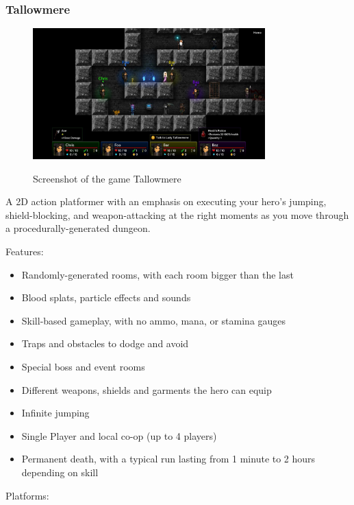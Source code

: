 \documentclass[12p]{article}
\begin{document}
\subsubsection[Tallowmere]{Tallowmere \cite{Tallowmere}} \label{sec:StateOfTheArt_Tallowmere}

\begin{figure}[ht]
  \center
  \includegraphics[width=0.8\textwidth]{StateOfTheArtScreenshots/tallowmere.jpeg}
  \label{sec:StateOfTheArt_Screenshots_Tallowmere}
  \caption{Screenshot of the game Tallowmere \cite{Tallowmere}}
\end{figure}

A 2D action platformer with an emphasis on executing your hero's jumping, shield-blocking, and weapon-attacking at the right moments as you move through a procedurally-generated dungeon.

Features:

\begin{itemize}
  \item Randomly-generated rooms, with each room bigger than the last
  \item Blood splats, particle effects and sounds
  \item Skill-based gameplay, with no ammo, mana, or stamina gauges
  \item Traps and obstacles to dodge and avoid
  \item Special boss and event rooms
  \item Different weapons, shields and garments the hero can equip
  \item Infinite jumping
  \item Single Player and local co-op (up to 4 players)
  \item Permanent death, with a typical run lasting from 1 minute to 2 hours depending on skill
\end{itemize}

Platforms:
\end{document}
